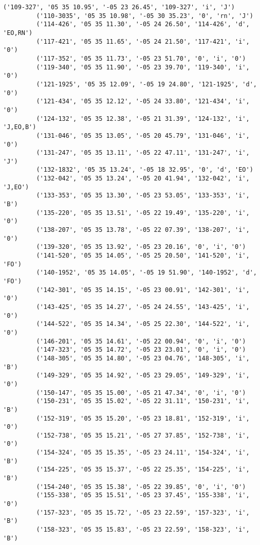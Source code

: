 \documentclass{article}
\begin{document}
\begin{Verbatim}[commandchars=\\\{\}]
         ('109-327', '05 35 10.95', '-05 23 26.45', '109-327', 'i', 'J')
         ('110-3035', '05 35 10.98', '-05 30 35.23', '0', 'rn', 'J')
         ('114-426', '05 35 11.30', '-05 24 26.50', '114-426', 'd', 'EO,RN')
         ('117-421', '05 35 11.65', '-05 24 21.50', '117-421', 'i', '0')
         ('117-352', '05 35 11.73', '-05 23 51.70', '0', 'i', '0')
         ('119-340', '05 35 11.90', '-05 23 39.70', '119-340', 'i', '0')
         ('121-1925', '05 35 12.09', '-05 19 24.80', '121-1925', 'd', '0')
         ('121-434', '05 35 12.12', '-05 24 33.80', '121-434', 'i', '0')
         ('124-132', '05 35 12.38', '-05 21 31.39', '124-132', 'i', 'J,EO,B')
         ('131-046', '05 35 13.05', '-05 20 45.79', '131-046', 'i', '0')
         ('131-247', '05 35 13.11', '-05 22 47.11', '131-247', 'i', 'J')
         ('132-1832', '05 35 13.24', '-05 18 32.95', '0', 'd', 'EO')
         ('132-042', '05 35 13.24', '-05 20 41.94', '132-042', 'i', 'J,EO')
         ('133-353', '05 35 13.30', '-05 23 53.05', '133-353', 'i', 'B')
         ('135-220', '05 35 13.51', '-05 22 19.49', '135-220', 'i', '0')
         ('138-207', '05 35 13.78', '-05 22 07.39', '138-207', 'i', '0')
         ('139-320', '05 35 13.92', '-05 23 20.16', '0', 'i', '0')
         ('141-520', '05 35 14.05', '-05 25 20.50', '141-520', 'i', 'FO')
         ('140-1952', '05 35 14.05', '-05 19 51.90', '140-1952', 'd', 'FO')
         ('142-301', '05 35 14.15', '-05 23 00.91', '142-301', 'i', '0')
         ('143-425', '05 35 14.27', '-05 24 24.55', '143-425', 'i', '0')
         ('144-522', '05 35 14.34', '-05 25 22.30', '144-522', 'i', '0')
         ('146-201', '05 35 14.61', '-05 22 00.94', '0', 'i', '0')
         ('147-323', '05 35 14.72', '-05 23 23.01', '0', 'i', '0')
         ('148-305', '05 35 14.80', '-05 23 04.76', '148-305', 'i', 'B')
         ('149-329', '05 35 14.92', '-05 23 29.05', '149-329', 'i', '0')
         ('150-147', '05 35 15.00', '-05 21 47.34', '0', 'i', '0')
         ('150-231', '05 35 15.02', '-05 22 31.11', '150-231', 'i', 'B')
         ('152-319', '05 35 15.20', '-05 23 18.81', '152-319', 'i', '0')
         ('152-738', '05 35 15.21', '-05 27 37.85', '152-738', 'i', '0')
         ('154-324', '05 35 15.35', '-05 23 24.11', '154-324', 'i', 'B')
         ('154-225', '05 35 15.37', '-05 22 25.35', '154-225', 'i', 'B')
         ('154-240', '05 35 15.38', '-05 22 39.85', '0', 'i', '0')
         ('155-338', '05 35 15.51', '-05 23 37.45', '155-338', 'i', '0')
         ('157-323', '05 35 15.72', '-05 23 22.59', '157-323', 'i', 'B')
         ('158-323', '05 35 15.83', '-05 23 22.59', '158-323', 'i', 'B')

\end{Verbatim}
\end{document}
